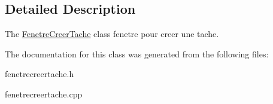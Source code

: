 \subsection{Detailed Description}
The \hyperlink{class_fenetre_creer_tache}{Fenetre\+Creer\+Tache} class fenetre pour creer une tache. 

The documentation for this class was generated from the following files\+:\begin{DoxyCompactItemize}
\item 
fenetrecreertache.\+h\item 
fenetrecreertache.\+cpp\end{DoxyCompactItemize}
